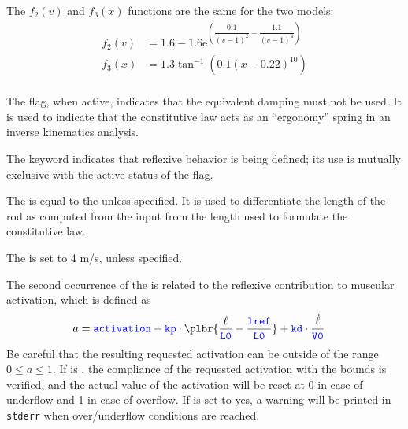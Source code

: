 The $f_2(v)$ and $f_3(x)$ functions are the same for the two models:
\begin{align}
  f_2(v) &= 1.6 - 1.6\mathrm{e}^{\left(\dfrac{0.1}{(v - 1)^2} - \dfrac{1.1}{(v - 1)^4}\right)} \\
  f_3(x) &= 1.3\tan^{-1}(0.1(x - 0.22)^{10}) \\
\end{align}

The  flag, when active, indicates that the equivalent damping must not be
used. It is used to indicate that the constitutive law acts as an ``ergonomy'' spring in
an inverse kinematics analysis.

The  keyword indicates that reflexive behavior is being defined;
its use is mutually exclusive with the active status of the  flag.

The  is equal to the  unless specified.
It is used to differentiate the length of the rod as computed from the input
from the length used to formulate the constitutive law.

The  is set to 4 m/s, unless specified.

The second occurrence of the  is related
to the reflexive contribution to muscular activation, which is defined as
\begin{align}
	a
	&=
	\nt{activation}
	+
	\nt{kp} \cdot \plbr{
		\frac{\ell}{\nt{L0}}
		-
		\frac{\nt{lref}}{\nt{L0}}
	}
	+
	\nt{kd} \cdot \frac{\dot{\ell}}{\nt{V0}}
\end{align}
Be careful that the resulting requested activation can be outside of the range 
${0 \leq a \leq 1}$. If  is , the compliance of
the requested activation with the bounds is verified, and the actual value of the
activation will be reset at 0 in case of underflow and 1 in case of overflow. If 
is set to yes, a warning will be printed in \texttt{stderr} when over/underflow conditions
are reached. 


